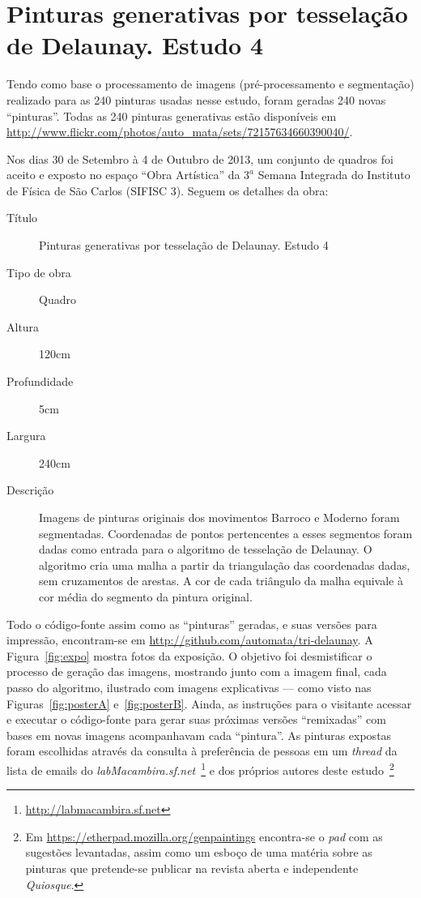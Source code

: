 \chapter{Pinturas generativas por tesselação de Delaunay. Estudo 4}
\label{ap:sifisc}

Tendo como base o processamento de imagens (pré-processamento e segmentação)
realizado para as 240 pinturas usadas nesse estudo, foram geradas 240 novas
``pinturas''. Todas as 240 pinturas generativas estão disponíveis em
\url{http://www.flickr.com/photos/auto_mata/sets/72157634660390040/}.

Nos dias 30 de Setembro à 4 de Outubro de 2013, um conjunto de quadros foi
aceito e exposto no espaço ``Obra Artística'' da $3^a$ Semana Integrada do
Instituto de Física de São Carlos (SIFISC 3). Seguem os detalhes da obra:

\begin{description}
  \item[Título] Pinturas generativas por tesselação de Delaunay. Estudo 4
  \item[Tipo de obra] Quadro
  \item[Altura] 120cm
  \item[Profundidade] 5cm
  \item[Largura] 240cm
  \item[Descrição] Imagens de pinturas originais dos movimentos Barroco e Moderno foram
    segmentadas. Coordenadas de pontos pertencentes a esses segmentos foram dadas
    como entrada para o algoritmo de tesselação de Delaunay. O algoritmo cria uma
    malha a partir da triangulação das coordenadas dadas, sem cruzamentos de
    arestas. A cor de cada triângulo da malha equivale à cor média do segmento da
    pintura original.
\end{description}

Todo o código-fonte assim como as ``pinturas'' geradas, e suas versões para
impressão, encontram-se em \url{http://github.com/automata/tri-delaunay}. A
Figura~\ref{fig:expo} mostra fotos da exposição. O objetivo foi desmistificar o
processo de geração das imagens, mostrando junto com a imagem final, cada passo
do algoritmo, ilustrado com imagens explicativas --- como visto nas
Figuras~\ref{fig:posterA} e~\ref{fig:posterB}. Ainda, as instruções para o
visitante acessar e executar o código-fonte para gerar suas próximas versões
``remixadas'' com bases em novas imagens acompanhavam cada ``pintura''. As
pinturas expostas foram escolhidas através da consulta à preferência de pessoas
em um \textit{thread} da lista de emails do
\emph{labMacambira.sf.net}~\footnote{\url{http://labmacambira.sf.net}} e dos
próprios autores deste estudo~\footnote{Em
  \url{https://etherpad.mozilla.org/genpaintings} encontra-se o \textit{pad} com
  as sugestões levantadas, assim como um esboço de uma matéria sobre as pinturas
  que pretende-se publicar na revista aberta e independente \textit{Quiosque}.}

